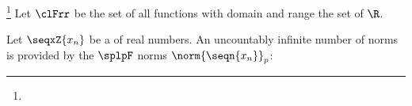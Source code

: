 \begin{example}
\footnote{
  }
\label{ex:ln_norm}
Let $\clFrr$ be the set of all functions with domain and range the set of  $\R$.
\end{example}

\begin{example}[$l_p$ norms]
\label{ex:norms}
Let $\seqxZ{x_n}$ be a   of real numbers.
An uncountably infinite number of norms is provided by the $\splpF$ norms $\norm{\seqn{x_n}}_p$:
\end{example}
